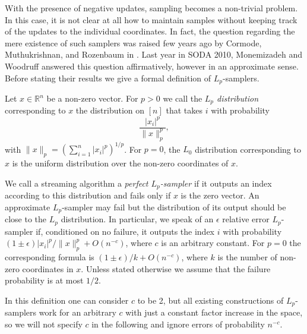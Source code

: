    With the presence of negative updates, sampling becomes a non-trivial problem. In this case,
   it is not clear at all how to maintain samples without keeping track of the updates
    to the individual coordinates. In fact, the question
    regarding the mere existence of such samplers was raised few years ago by Cormode,
    Muthukrishnan, and Rozenbaum in \cite{CormodeMR05}. Last year in SODA 2010, 
    Monemizadeh and Woodruff \cite{MonemizadehW10} answered this question
    affirmatively, however in an approximate sense. Before stating 
     their results we give a formal definition of 
    $L_p$-samplers.

\begin{definition}
Let $x \in \mathbb{R}^n$ be a non-zero vector. For
$p>0$ we call the {\em $L_p$ distribution} corresponding to $x$ the
distribution on $[n]$ that takes $i$ with probability
$$\frac{|x_i|^p}{\|x\|_p^p},$$
with $\|x\|_p=(\sum_{i=1}^n|x_i|^p)^{1/p}$. For $p=0$,
the $L_0$ distribution
corresponding to $x$ is the uniform distribution over the non-zero coordinates
of $x$.
\end{definition}

We call a streaming algorithm a {\em perfect $L_p$-sampler} if it outputs an
index according to this distribution and fails only if $x$ is the zero
vector. An approximate $L_p$-sampler may fail but the distribution of its
output should be close to the $L_p$ distribution. In particular, we speak of an $\epsilon$ relative
error $L_p$-sampler if, conditioned on no failure, it outputs the index $i$
with probability $(1\pm\epsilon)|x_i|^p/\|x\|_p^p+O(n^{-c})$, where $c$ is an
arbitrary constant. For $p=0$ the corresponding formula is
$(1\pm\epsilon)/k+O(n^{-c})$, where $k$ is the number of non-zero coordinates
in $x$. Unless stated otherwise we assume
that the failure probability is at most $1/2$.

In this definition one can consider $c$ to be 2, but all existing
constructions of $L_p$-samplers work for an arbitrary $c$ with just a
constant factor increase in the space, so we will not specify $c$ in the
following and ignore errors of probability $n^{-c}$.
 

